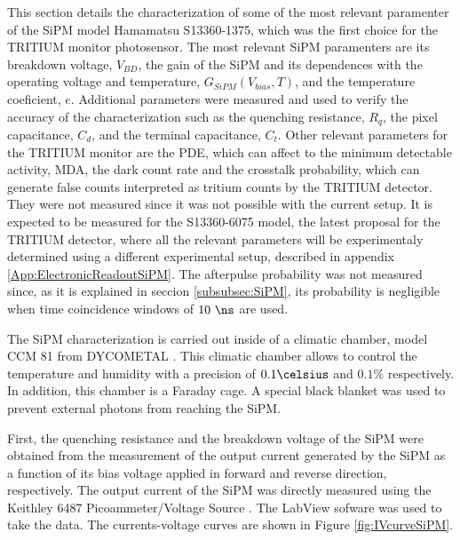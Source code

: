 This section details the characterization of some of the most relevant paramenter of the SiPM model Hamamatsu S13360-1375, which was the first choice for the TRITIUM monitor photosensor. The most relevant SiPM paramenters are its breakdown voltage, $V_{BD}$, the gain of the SiPM and its dependences with the operating voltage and temperature, $G_{SiPM}(V_{bias}, T)$, and the temperature coeficient, $e$. Additional parameters were measured and used to verify the accuracy of the characterization such as the quenching resistance, $R_q$, the pixel capacitance, $C_d$, and the terminal capacitance, $C_t$. Other relevant parameters for the TRITIUM monitor are the PDE, which can affect to the minimum detectable activity, MDA, the dark count rate and the crosstalk probability, which can generate false counts interpreted as tritium counts by the TRITIUM detector. They were not measured since it was not possible with the current setup. It is expected to be measured for the S13360-6075 model, the latest proposal for the TRITIUM detector, where all the relevant parameters will be experimentaly determined using a different experimental setup, described in appendix \ref{App:ElectronicReadoutSiPM}. The afterpulse probability was not measured since, as it is explained in seccion \ref{subsubsec:SiPM}, its probability is negligible when time coincidence windows of $10~\ns$ are used.

The SiPM characterization is carried out inside of a climatic chamber, model CCM 81 from DYCOMETAL \cite{ClimaticChamberIFIMED}. This climatic chamber allows to control the temperature and humidity with a precision of $0.1\celsius$ and $0.1\%$ respectively. In addition, this chamber is a Faraday cage. A special black blanket \cite{BlackBlancket} was used to prevent external photons from reaching the SiPM.

First, the quenching resistance and the breakdown voltage of the SiPM were obtained from the measurement of the output current generated by the SiPM as a function of its bias voltage applied in forward and reverse direction, respectively. The output current of the SiPM was directly measured using the Keithley 6487 Picoammeter/Voltage Source \cite{DataSheetKeithley6487}. The LabView sofware was used to take the data. The currents-voltage curves are shown in Figure \ref{fig:IVcurveSiPM}.

